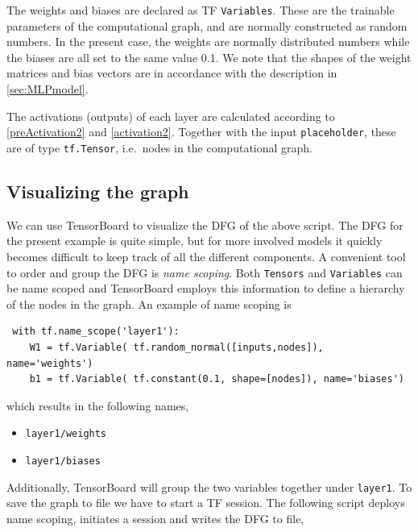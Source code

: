 \documentclass[twoside,english]{uiofysmaster}
\begin{document}
The weights and biases are declared as TF \texttt{Variables}. These are the trainable parameters 
of the computational graph, and are normally constructed as random numbers. In the present case,
the weights are normally distributed numbers while the biases are all set to the same value 0.1. 
We note that the shapes of the weight matrices and bias vectors are in accordance with the description in 
\autoref{sec:MLPmodel}.

The activations (outputs) of each layer are calculated according to \eqref{preActivation2} and \eqref{activation2}. 
Together with the input \texttt{placeholder}, these are of type \texttt{tf.Tensor}, i.e.\ nodes in the computational 
graph. 

\subsection{Visualizing the graph}
We can use TensorBoard to visualize the DFG of the above script. The DFG for the present example is quite
simple, but for more involved models it quickly becomes difficult to keep track of all the different components. 
A convenient tool to order and group the DFG is \textit{name scoping}. Both \texttt{Tensors} and \texttt{Variables} can 
be name scoped and TensorBoard employs this information to define a hierarchy of the nodes in the graph. 
An example of name scoping is
\begin{verbatim}
 with tf.name_scope('layer1'):
    W1 = tf.Variable( tf.random_normal([inputs,nodes]), name='weights')
    b1 = tf.Variable( tf.constant(0.1, shape=[nodes]), name='biases')
\end{verbatim}
which results in the following names,
\begin{itemize}
 \item \texttt{layer1/weights}
 \item \texttt{layer1/biases}
\end{itemize}
Additionally, TensorBoard will group the two variables together under \texttt{layer1}. 
To save the graph to file we have to start a TF session. The following script 
deploys name scoping, initiates a session and writes the DFG to file,
\end{document}

